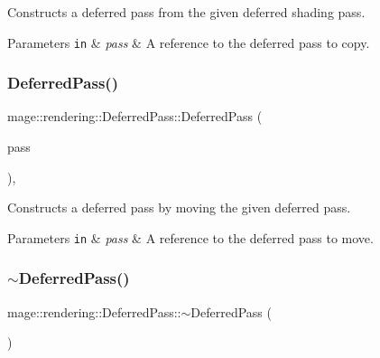 Constructs a deferred pass from the given deferred shading pass.


\begin{DoxyParams}[1]{Parameters}
\mbox{\tt in}  & {\em pass} & A reference to the deferred pass to copy. \\
\hline
\end{DoxyParams}
\mbox{\label{classmage_1_1rendering_1_1_deferred_pass_a606cd3fdf0c6b53e1125d431cf782a6d}} 
\subsubsection{\texorpdfstring{Deferred\+Pass()}{DeferredPass()}\hspace{0.1cm}{\footnotesize\ttfamily [3/3]}}
{\footnotesize\ttfamily mage\+::rendering\+::\+Deferred\+Pass\+::\+Deferred\+Pass (\begin{DoxyParamCaption}\item[{\mbox{\hyperlink{classmage_1_1rendering_1_1_deferred_pass}{Deferred\+Pass}} \&\&}]{pass }\end{DoxyParamCaption})\hspace{0.3cm}{\ttfamily [default]}, {\ttfamily [noexcept]}}

Constructs a deferred pass by moving the given deferred pass.


\begin{DoxyParams}[1]{Parameters}
\mbox{\tt in}  & {\em pass} & A reference to the deferred pass to move. \\
\hline
\end{DoxyParams}
\mbox{\label{classmage_1_1rendering_1_1_deferred_pass_a6b5138ee7624ecb17b30c1e337bd483e}} 
\subsubsection{\texorpdfstring{$\sim$\+Deferred\+Pass()}{~DeferredPass()}}
{\footnotesize\ttfamily mage\+::rendering\+::\+Deferred\+Pass\+::$\sim$\+Deferred\+Pass (\begin{DoxyParamCaption}{ }\end{DoxyParamCaption})\hspace{0.3cm}{\ttfamily [default]}}

